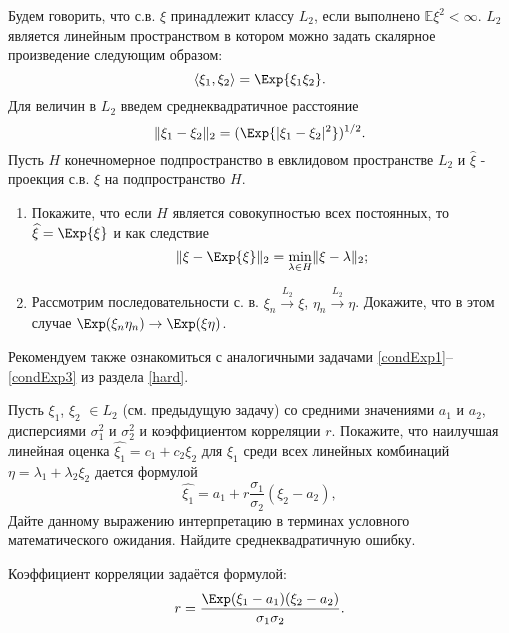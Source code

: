 \begin{problem}
Будем говорить, что  с.в. $\xi$ принадлежит классу $L_2$, если  выполнено ${\mathbb E}\xi^2<\infty$. $L_2$ является линейным пространством в котором можно задать скалярное произведение следующим образом:
\[
\langle \xi_1, \xi_2 \rangle = \Exp{\xi_1 \xi_2}.
\]
Для величин в $L_2$ введем среднеквадратичное расстояние
\[
\Vert \xi_1 - \xi_2 \Vert_2 = (\Exp{|\xi_1 - \xi_2|^2})^{1/2}.
\]
Пусть $H$ конечномерное  подпространство в евклидовом пространстве  $L_2$ и $\widehat{\xi}$ - проекция с.в. $\xi$ на подпространство $H$.

\begin{enumerate}

\item Покажите, что если $H$ является совокупностью всех постоянных, то 
$\widehat{\xi}  = \Exp{\xi}$ и как следствие 
\[
\Vert \xi - \Exp{\xi} \Vert_2 = \underset{\lambda \in H}{\min} \Vert \xi - \lambda \Vert_2;
\] 

\item Рассмотрим  последовательности с. в. $\xi_n \overset{L_2}{\longrightarrow} \xi$, $\eta_n \overset{L_2}{\longrightarrow} \eta$. Докажите, что в этом случае  $\Exp(\xi_n \eta_n) \rightarrow \Exp(\xi \eta)$. 

\end{enumerate}

\end{problem}

\begin{remark}
Рекомендуем также ознакомиться с аналогичными задачами \ref{condExp1}--\ref{condExp3} из раздела \ref{hard}. 
\end{remark}

\begin{problem}
Пусть  $\xi_1$, $\xi_2$ $\in L_2$ (см. предыдущую задачу) со средними значениями $a_1$ и $a_2$, дисперсиями $\sigma_1^2$ и $\sigma_2^2$ 
и коэффициентом корреляции $r$. Покажите, что наилучшая линейная оценка
$\widehat{\xi_1}  = c_1 + c_2 \xi_2$ для $\xi_1$ среди всех линейных комбинаций $\eta  = \lambda_1 + \lambda_2 \xi_2$  дается формулой 
\[
\widehat{\xi_1}  = a_1 + r \frac{\sigma_1}{\sigma_2} (\xi_2 - a_2),
\]
Дайте данному выражению интерпретацию в терминах условного математического ожидания. Найдите среднеквадратичную ошибку.
\end{problem}
\begin{remark}
Коэффициент корреляции задаётся формулой: 
\[
r = \frac{\Exp (\xi_1 - a_1) (\xi_2 - a_2)}{\sigma_1 \sigma_2}.
\]
\end{remark}

